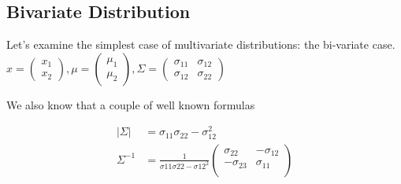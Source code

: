 \subsection{Bivariate Distribution}
Let's examine the simplest case of multivariate distributions: the bi-variate case. $x=\begin{pmatrix} x_1 \\ x_2\end{pmatrix},\mu=\begin{pmatrix} \mu_1 \\ \mu_2\end{pmatrix},\Sigma = \begin{pmatrix} \sigma_{11} & \sigma_{12}  \\ \sigma_{12} &\sigma_{22}\end{pmatrix}$

We also know that a couple of well known formulas

\begin{align*}
    |\Sigma| &= \sigma_{11}\sigma_{22}-\sigma_{12}^2 \\
    \Sigma^{-1} &= \frac{1}{\sigma{11}\sigma{22}-\sigma{12}^2}
    \begin{pmatrix}
    \sigma_{22} & -\sigma_{12} \\
    -\sigma_{23} & \sigma_{11} \\
    \end{pmatrix}
\end{align*}


